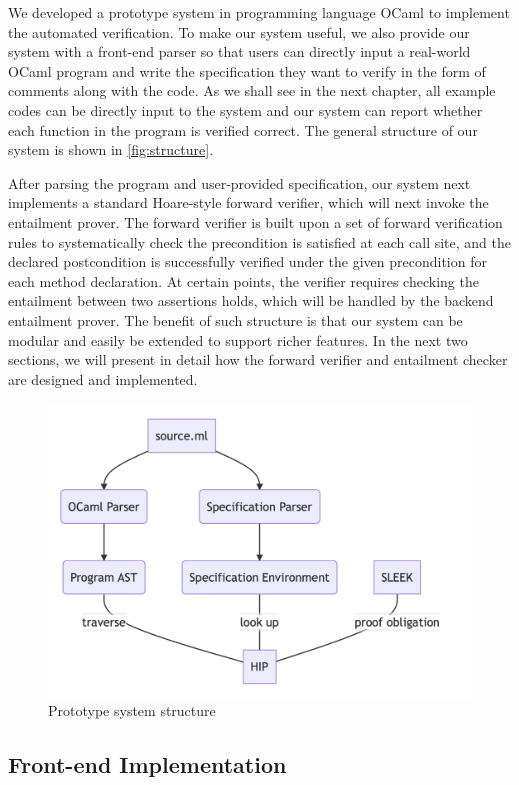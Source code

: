 We developed a prototype system in programming language OCaml to implement the automated verification. To make our system useful, we also provide our system with a front-end parser so that users can directly input a real-world OCaml program and write the specification they want to verify in the form of comments along with the code. As we shall see in the next chapter, all example codes can be directly input to the system and our system can report whether each function in the program is verified correct. The general structure of our system is shown in \autoref{fig:structure}.

After parsing the program and user-provided specification, our system next
implements a standard Hoare-style forward verifier, which will next invoke
the entailment prover. The forward verifier is built upon a set of forward
verification rules to systematically check the precondition is satisfied at
each call site, and the declared postcondition is successfully verified
under the given precondition for each method declaration. At certain points,
the verifier requires checking the entailment between two assertions holds, 
which will be handled by the backend entailment prover. The benefit of 
such structure is that our system can be modular and easily be extended 
to support richer features. In the next two sections, we will present in 
detail how the forward verifier and entailment checker are designed
and implemented.

\begin{figure}
    \centering
    \includegraphics[width=0.8\linewidth]{report/pic/ch-Design/structure.png}
    \caption{Prototype system structure}
    \label{fig:structure}
\end{figure}

\subsection{Front-end Implementation}




